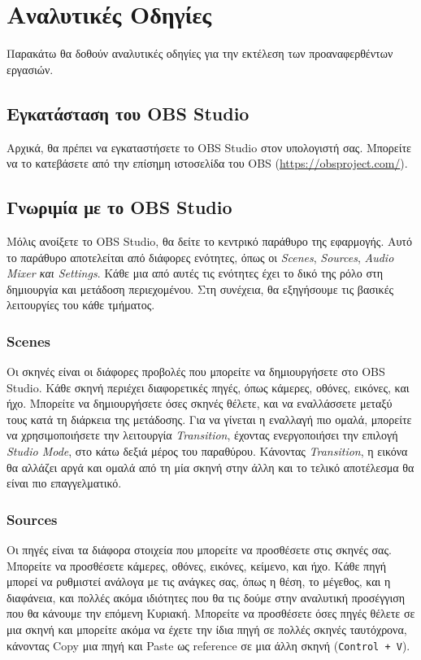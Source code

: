 \documentclass[12pt,a4paper]{article}
\begin{document}
\section{Αναλυτικές Οδηγίες}
Παρακάτω θα δοθούν αναλυτικές οδηγίες για την εκτέλεση των προαναφερθέντων εργασιών.
\subsection{Εγκατάσταση του OBS Studio}
Αρχικά, θα πρέπει να εγκαταστήσετε το OBS Studio στον υπολογιστή σας.
Μπορείτε να το κατεβάσετε από την επίσημη ιστοσελίδα του OBS (\url{https://obsproject.com/}).
\subsection{Γνωριμία με το OBS Studio}
Μόλις ανοίξετε το OBS Studio, θα δείτε το κεντρικό παράθυρο της εφαρμογής. Αυτό το παράθυρο
αποτελείται από διάφορες ενότητες, όπως οι \textit{Scenes}, \textit{Sources}, \textit{Audio Mixer
  και \textit{Settings}}. Κάθε μια από αυτές τις ενότητες έχει το δικό της ρόλο στη δημιουργία
και μετάδοση περιεχομένου. Στη συνέχεια, θα εξηγήσουμε τις βασικές λειτουργίες του κάθε τμήματος.
\subsubsection{Scenes}
Οι σκηνές είναι οι διάφορες προβολές που μπορείτε να δημιουργήσετε στο OBS Studio. Κάθε σκηνή
περιέχει διαφορετικές πηγές, όπως κάμερες, οθόνες, εικόνες, και ήχο. Μπορείτε να δημιουργήσετε
όσες σκηνές θέλετε, και να εναλλάσσετε μεταξύ τους κατά τη διάρκεια της μετάδοσης. Για να
γίνεται η εναλλαγή πιο ομαλά, μπορείτε να χρησιμοποιήσετε την λειτουργία \textit{Transition},
έχοντας ενεργοποιήσει την επιλογή \textit{Studio Mode}, στο κάτω δεξιά μέρος του παραθύρου. Κάνοντας
\textit{Transition}, η εικόνα θα αλλάζει αργά και ομαλά από τη μία σκηνή στην άλλη και το τελικό
αποτέλεσμα θα είναι πιο επαγγελματικό.
\subsubsection{Sources}
Οι πηγές είναι τα διάφορα στοιχεία που μπορείτε να προσθέσετε στις σκηνές σας. Μπορείτε να
προσθέσετε κάμερες, οθόνες, εικόνες, κείμενο, και ήχο. Κάθε πηγή μπορεί να ρυθμιστεί ανάλογα
με τις ανάγκες σας, όπως η θέση, το μέγεθος, και η διαφάνεια, και πολλές ακόμα ιδιότητες που θα τις
δούμε στην αναλυτική προσέγγιση που θα κάνουμε την επόμενη Κυριακή. Μπορείτε να προσθέσετε όσες πηγές θέλετε σε
μια σκηνή και μπορείτε ακόμα να έχετε την ίδια πηγή σε πολλές σκηνές ταυτόχρονα, κάνοντας Copy μια πηγή
και Paste ως reference σε μια άλλη σκηνή (\texttt{Control + V}).
\end{document}
